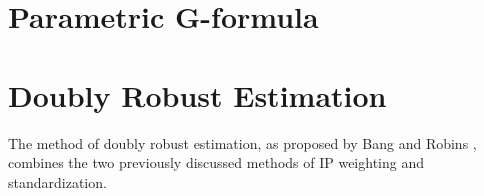 \section{Parametric G-formula} 

\section{Doubly Robust Estimation} 
The method of doubly robust estimation, as proposed by Bang and Robins \cite{bang2005doubly}, combines the two previously discussed methods of IP weighting and standardization.  













